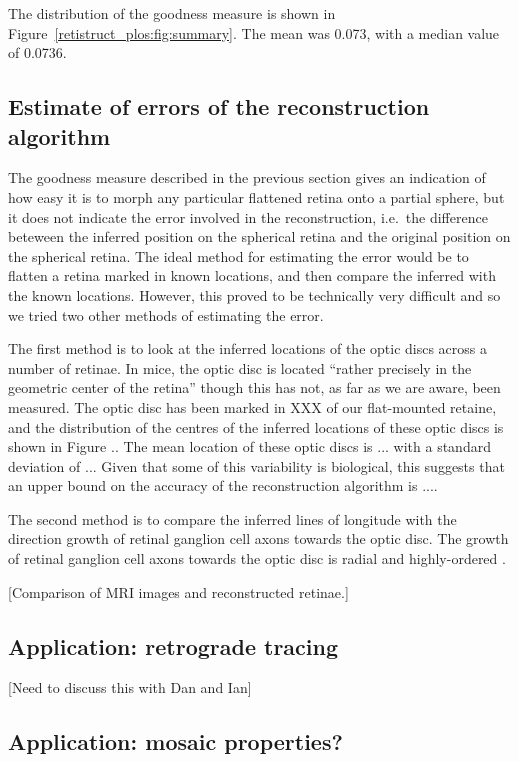 \documentclass[10pt]{article}
\newcommand{\todo}[1]{{\color{red}[#1]}}
\begin{document}
The distribution of the goodness measure is shown in
Figure~\ref{retistruct_plos:fig:summary}. The mean was 0.073, with a
median value of 0.0736. 

\subsection*{Estimate of errors of the reconstruction algorithm}

The goodness measure described in the previous section gives an
indication of how easy it is to morph any particular flattened retina
onto a partial sphere, but it does not indicate the error involved in
the reconstruction, i.e.\ the difference beteween the inferred
position on the spherical retina and the original position on the
spherical retina. The ideal method for estimating the error would be
to flatten a retina marked in known locations, and then compare the
inferred with the known locations. However, this proved to be
technically very difficult and so we tried two other methods of
estimating the error.

The first method is to look at the inferred locations of the optic
discs across a number of retinae. In mice, the optic disc is located
``rather precisely in the geometric center of the retina''
\cite{DragOlse81gang} though this has not, as far as we are aware,
been measured. The optic disc has been marked in XXX of our
flat-mounted retaine, and the distribution of the centres of the
inferred locations of these optic discs is shown in Figure .. The mean
location of these optic discs is ... with a standard deviation of
... Given that some of this variability is biological, this suggests
that an upper bound on the accuracy of the reconstruction algorithm is
.... 

The second method is to compare the inferred lines of longitude with
the direction growth of retinal ganglion cell axons towards the optic
disc.  The growth of retinal ganglion cell axons towards the optic
disc is radial and highly-ordered \cite{ErskThom09intr}.

\todo{Comparison of MRI images and reconstructed retinae.}

\subsection*{Application: retrograde tracing}

\todo{Need to discuss this with Dan and Ian}

\subsection*{Application: mosaic properties?}
\end{document}
